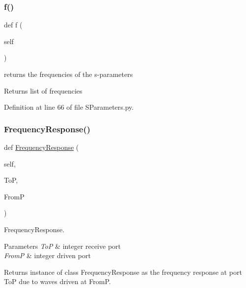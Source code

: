 \subsubsection{\texorpdfstring{f()}{f()}}
{\footnotesize\ttfamily def f (\begin{DoxyParamCaption}\item[{}]{self }\end{DoxyParamCaption})}



returns the frequencies of the s-\/parameters 

\begin{DoxyReturn}{Returns}
list of frequencies 
\end{DoxyReturn}


Definition at line 66 of file S\+Parameters.\+py.

\mbox{\label{classSignalIntegrity_1_1SParameters_1_1SParameters_1_1SParameters_a55a7157cd888766a891ff22694e62613}} 
\subsubsection{\texorpdfstring{Frequency\+Response()}{FrequencyResponse()}}
{\footnotesize\ttfamily def \hyperlink{classSignalIntegrity_1_1FrequencyDomain_1_1FrequencyResponse_1_1FrequencyResponse}{Frequency\+Response} (\begin{DoxyParamCaption}\item[{}]{self,  }\item[{}]{ToP,  }\item[{}]{FromP }\end{DoxyParamCaption})}



Frequency\+Response. 


\begin{DoxyParams}{Parameters}
{\em ToP} & integer receive port \\
\hline
{\em FromP} & integer driven port \\
\hline
\end{DoxyParams}
\begin{DoxyReturn}{Returns}
instance of class Frequency\+Response as the frequency response at port ToP due to waves driven at FromP. 
\end{DoxyReturn}


